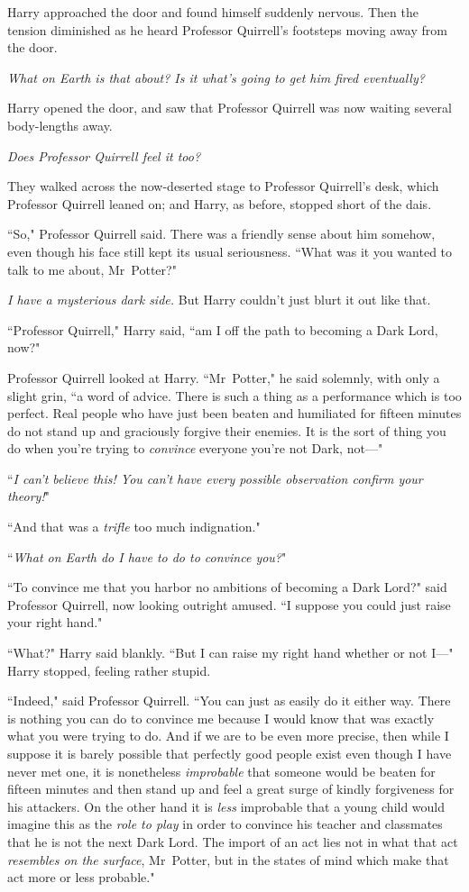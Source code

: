 Harry approached the door and found himself suddenly nervous. Then the tension diminished as he heard Professor Quirrell's footsteps moving away from the door.

\emph{What on Earth is that about? Is it what's going to get him fired eventually?}

Harry opened the door, and saw that Professor Quirrell was now waiting several body-lengths away.

\emph{Does Professor Quirrell feel it too?}

They walked across the now-deserted stage to Professor Quirrell's desk, which Professor Quirrell leaned on; and Harry, as before, stopped short of the dais.

``So," Professor Quirrell said. There was a friendly sense about him somehow, even though his face still kept its usual seriousness. ``What was it you wanted to talk to me about, Mr~Potter?"

\emph{I have a mysterious dark side.} But Harry couldn't just blurt it out like that.

``Professor Quirrell," Harry said, ``am I off the path to becoming a Dark Lord, now?"

Professor Quirrell looked at Harry. ``Mr~Potter," he said solemnly, with only a slight grin, ``a word of advice. There is such a thing as a performance which is too perfect. Real people who have just been beaten and humiliated for fifteen minutes do not stand up and graciously forgive their enemies. It is the sort of thing you do when you're trying to \emph{convince} everyone you're not Dark, not—"

``\emph{I can't believe this! You can't have every possible observation confirm your theory!}"

``And that was a \emph{trifle} too much indignation."

``\emph{What on Earth do I have to do to convince you?}"

``To convince me that you harbor no ambitions of becoming a Dark Lord?" said Professor Quirrell, now looking outright amused. ``I suppose you could just raise your right hand."

``What?" Harry said blankly. ``But I can raise my right hand whether or not I—" Harry stopped, feeling rather stupid.

``Indeed," said Professor Quirrell. ``You can just as easily do it either way. There is nothing you can do to convince me because I would know that was exactly what you were trying to do. And if we are to be even more precise, then while I suppose it is barely possible that perfectly good people exist even though I have never met one, it is nonetheless \emph{improbable} that someone would be beaten for fifteen minutes and then stand up and feel a great surge of kindly forgiveness for his attackers. On the other hand it is \emph{less} improbable that a young child would imagine this as the \emph{role to play} in order to convince his teacher and classmates that he is not the next Dark Lord. The import of an act lies not in what that act \emph{resembles on the surface}, Mr~Potter, but in the states of mind which make that act more or less probable."

